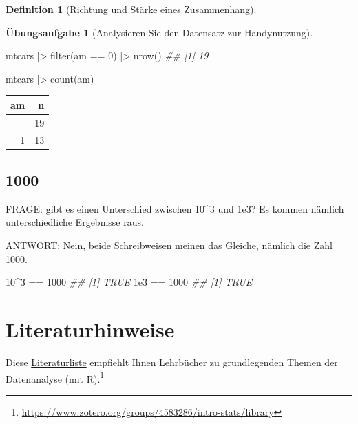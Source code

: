 \documentclass[
  a4paper,
  DIV=11]{scrreprt}
\newenvironment{Shaded}{\begin{snugshade}}{\end{snugshade}}
\newcommand{\DecValTok}[1]{\textcolor[rgb]{0.68,0.00,0.00}{#1}}
\newcommand{\DocumentationTok}[1]{\textcolor[rgb]{0.37,0.37,0.37}{\textit{#1}}}
\newcommand{\FloatTok}[1]{\textcolor[rgb]{0.68,0.00,0.00}{#1}}
\newcommand{\FunctionTok}[1]{\textcolor[rgb]{0.28,0.35,0.67}{#1}}
\newcommand{\NormalTok}[1]{\textcolor[rgb]{0.00,0.23,0.31}{#1}}
\newcommand{\SpecialCharTok}[1]{\textcolor[rgb]{0.37,0.37,0.37}{#1}}
\theoremstyle{definition}
\newtheorem{exercise}{Übungsaufgabe}[chapter]
\theoremstyle{definition}
\theoremstyle{definition}
\newtheorem{definition}{Definition}[chapter]
\theoremstyle{remark}
\begin{document}
\begin{definition}[Richtung und Stärke eines
Zusammenhang]
\begin{exercise}[Analysieren Sie den Datensatz zur
Handynutzung]
\begin{Shaded}
\begin{Highlighting}[]
\NormalTok{mtcars }\SpecialCharTok{|\textgreater{}} 
  \FunctionTok{filter}\NormalTok{(am }\SpecialCharTok{==} \DecValTok{0}\NormalTok{) }\SpecialCharTok{|\textgreater{}} 
  \FunctionTok{nrow}\NormalTok{()}
\DocumentationTok{\#\# [1] 19}
\end{Highlighting}
\end{Shaded}

\begin{Shaded}
\begin{Highlighting}[]
\NormalTok{mtcars }\SpecialCharTok{|\textgreater{}} 
  \FunctionTok{count}\NormalTok{(am)}
\end{Highlighting}
\end{Shaded}

\begin{longtable}[]{@{}rr@{}}
\toprule\noalign{}
am & n \\
\midrule\noalign{}
\endhead
\bottomrule\noalign{}
\endlastfoot
0 & 19 \\
1 & 13 \\
\end{longtable}

\subsection{1000}\label{section-1}

FRAGE: gibt es einen Unterschied zwischen 10\^{}3 und 1e3? Es kommen
nämlich unterschiedliche Ergebnisse raus.

ANTWORT: Nein, beide Schreibweisen meinen das Gleiche, nämlich die Zahl
1000.

\begin{Shaded}
\begin{Highlighting}[]
\DecValTok{10}\SpecialCharTok{\^{}}\DecValTok{3} \SpecialCharTok{==} \DecValTok{1000} 
\DocumentationTok{\#\# [1] TRUE}
\FloatTok{1e3} \SpecialCharTok{==} \DecValTok{1000}
\DocumentationTok{\#\# [1] TRUE}
\end{Highlighting}
\end{Shaded}

\section{Literaturhinweise}\label{literaturhinweise-9}

Diese
\href{https://www.zotero.org/groups/4583286/intro-stats/library}{Literaturliste}
empfiehlt Ihnen Lehrbücher zu grundlegenden Themen der Datenanalyse (mit
R).\footnote{\url{https://www.zotero.org/groups/4583286/intro-stats/library}}


\end{exercise}
\end{definition}
\end{document}
